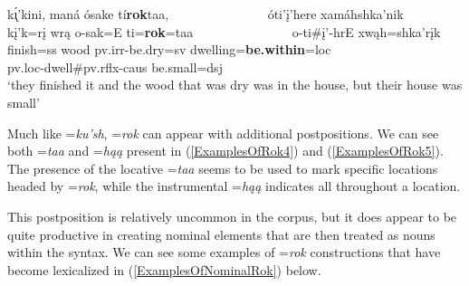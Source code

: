 \begin{exe}
\begin{xlist}
\item\label{ExamplesOfRok5} \glll k\'{ı̨}'kini, maná ósake tí\textbf{rok}taa, ~ ~ ~ ~ ~ ~ ~ ~ ~  óti'į'here xamáhshka'nik\\
    kį'k=rį wrą o-sak=E ti=\textbf{rok}=taa ~ ~ ~ ~ ~ ~ ~ ~ ~ o-ti\#į'-hrE xwąh=shka'rįk\\
    \textnormal{finish}=ss \textnormal{wood} pv.irr-\textnormal{be.dry}=sv \textnormal{dwelling}=\textbf{\textnormal{be.within}}=loc ~ ~ ~ ~ ~ ~ ~ ~ ~  pv.loc-\textnormal{dwell}\#pv.rflx-caus \textnormal{be.small}=dsj\\
    \glt `they finished it and the wood that was dry was in the house, but their house was small' \citep[197]{hollow1973a}

\end{xlist} 

\end{exe}

Much like =\textit{ku'sh}, =\textit{rok} can appear with additional postpositions. We can see both =\textit{taa} and =\textit{hąą} present in (\ref{ExamplesOfRok4}) and (\ref{ExamplesOfRok5}). The presence of the locative =\textit{taa} seems to be used to mark specific locations headed by =\textit{rok}, while the instrumental =\textit{hąą} indicates all throughout a location.

This postposition is relatively uncommon in the corpus, but it does appear to be quite productive in creating nominal elements that are then treated as nouns within the syntax. We can see some examples of =\textit{rok} constructions that have become lexicalized in (\ref{ExamplesOfNominalRok}) below.

\newpage

